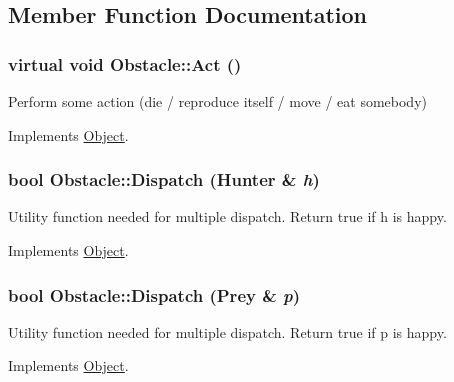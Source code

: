 \subsection{Member Function Documentation}
\hypertarget{classObstacle_a4e1f98a918838ca96638e7536e3748cb}{
\subsubsection[{Act}]{\setlength{\rightskip}{0pt plus 5cm}virtual void Obstacle::Act ()}}
\label{classObstacle_a4e1f98a918838ca96638e7536e3748cb}
Perform some action (die / reproduce itself / move / eat somebody) 

Implements \hyperlink{classObject_a683b351ee47dc69c4117cb9017c467d6}{Object}.

\hypertarget{classObstacle_a10634bf63cc9f11493002c7105fc7e93}{
\subsubsection[{Dispatch}]{\setlength{\rightskip}{0pt plus 5cm}bool Obstacle::Dispatch ({\bf Hunter} \& {\em h})}}
\label{classObstacle_a10634bf63cc9f11493002c7105fc7e93}
Utility function needed for multiple dispatch. Return true if h is happy. 

Implements \hyperlink{classObject_a0d0e1f0456837f6736913b1ba374f11d}{Object}.

\hypertarget{classObstacle_a68eae0dce57aa9f5c044d4223211bfab}{
\subsubsection[{Dispatch}]{\setlength{\rightskip}{0pt plus 5cm}bool Obstacle::Dispatch ({\bf Prey} \& {\em p})}}
\label{classObstacle_a68eae0dce57aa9f5c044d4223211bfab}
Utility function needed for multiple dispatch. Return true if p is happy. 

Implements \hyperlink{classObject_a70097e3ad4433aec0dd0b938fcedfeca}{Object}.

